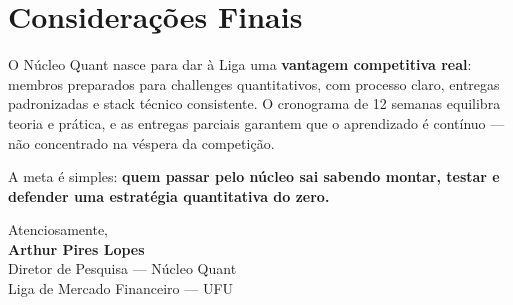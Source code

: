\documentclass[12pt,a4paper]{article}
\begin{document}
\section*{Considerações Finais}

O Núcleo Quant nasce para dar à Liga uma \textbf{vantagem competitiva real}: membros preparados para challenges quantitativos, com processo claro, entregas padronizadas e stack técnico consistente. O cronograma de 12 semanas equilibra teoria e prática, e as entregas parciais garantem que o aprendizado é contínuo — não concentrado na véspera da competição.

A meta é simples: \textbf{quem passar pelo núcleo sai sabendo montar, testar e defender uma estratégia quantitativa do zero.}

\vspace{1.5cm}

\begin{flushright}
    Atenciosamente,\\[0.5cm]
    \textbf{Arthur Pires Lopes}\\
    Diretor de Pesquisa — Núcleo Quant\\
    Liga de Mercado Financeiro — UFU
\end{flushright}
\end{document}
